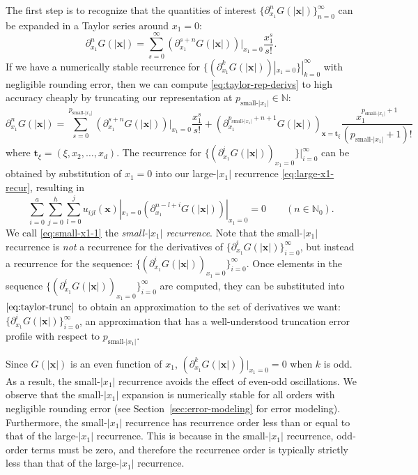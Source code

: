 \documentclass[12pt]{article}
\def\N{{\mathbb N}}
\let\b=\boldsymbol
\theoremstyle{definition}
\theoremstyle{plain}
\theoremstyle{definition}
\begin{document}
The first step is to recognize that the quantities of interest $\{\partial^n_{x_1} G(|\b{x}|)\}_{n=0}^{\infty}$ can be expanded in a Taylor series around $x_1 = 0$:
\begin{equation}
\label{eq:taylor-rep-derivs}
\partial^n_{x_1} G(|\b{x}|) = \sum_{s=0}^{\infty} \left( \partial^{s+n}_{x_1} G(|\b{x}|) \right)|_{x_1=0} \frac{x_1^s}{s!}.
\end{equation}
If we have a numerically stable recurrence for $\{(\partial^k_{x_1} G(|\b{x}|))|_{x_1=0}\}|_{k=0}^{\infty}$ with negligible rounding error, then we can compute \eqref{eq:taylor-rep-derivs} to high accuracy cheaply by truncating our representation at $p_{\text{small-$|x_1|$}} \in \N$:
\begin{equation}
\label{eq:taylor-trunc}
\partial^n_{x_1} G(|\b{x}|) = \sum_{s=0}^{p_{\text{small-$|x_1|$}}} \left( \partial^{s+n}_{x_1} G(|\b{x}|) \right)|_{x_1=0} \frac{x_1^s}{s!} + \left(\partial^{p_{\text{small-$|x_1|$}}+n+1}_{x_1} G(|\b{x}|)\right)_{\b{x}=\b{t}_{\xi}} \frac{x_1^{p_{\text{small-$|x_1|$}}+1}}{(p_{\text{small-$|x_1|$}}+1)!}
\end{equation}
where $\b{t}_{\xi}= (\xi, x_2, \dots, x_d)$. The recurrence for $\{(\partial^i_{x_1} G(|\b{x}|))_{x_1=0}\}|_{i=0}^{\infty}$ can be obtained by substitution of $x_1=0$ into our large-$|x_1|$ recurrence \eqref{eq:large-x1-recur}, resulting in
\begin{equation}
\label{eq:small-x1-1}
\sum_{i=0}^a  \sum_{j=0}^{h}  \sum_{l=0}^j u_{ijl}(\b{x})|_{x_1=0} \left(\partial^{n-l+i}_{x_1} G(|{\b x}|) \right)|_{x_1=0}= 0 \qquad  (n \in \N_{0}).
\end{equation}
We call \eqref{eq:small-x1-1} the \emph{small-$|x_1|$ recurrence}. Note that the small-$|x_1|$ recurrence is \emph{not} a recurrence for the derivatives of $\{\partial^i_{x_1} G(|\b{x}|)\}_{i=0}^\infty$, but instead a recurrence for the sequence: $\{\left(\partial^i_{x_1} G(|\b{x}|) \right)_{x_1=0}\}_{i=0}^\infty$. Once elements in the sequence $\{\left(\partial^i_{x_1} G(|\b{x}|) \right)_{x_1=0}\}_{i=0}^\infty$ are computed, they can be substituted into $\eqref{eq:taylor-trunc}$ to obtain an approximation to the set of derivatives we want: $\{\partial^i_{x_1} G(|\b{x}|)\}_{i=0}^\infty$, an approximation that has a well-understood truncation error profile with respect to $p_{\text{small-$|x_1|$}}$. 

Since $G(|\b{x}|)$ is an even function of $x_1$, $(\partial^k_{x_1} G(|\b{x}|))|_{x_1=0}=0$ when $k$ is odd. As a result, the small-$|x_1|$ recurrence avoids the effect of even-odd oscillations. We observe that the small-$|x_1|$ expansion is numerically stable for all orders with negligible rounding error (see Section~\ref{sec:error-modeling} for error modeling). Furthermore, the small-$|x_1|$ recurrence has recurrence order less than or equal to that of the large-$|x_1|$ recurrence. This is because in the small-$|x_1|$ recurrence, odd-order terms must be zero, and therefore the recurrence order is typically strictly less than that of the large-$|x_1|$ recurrence.
\end{document}
